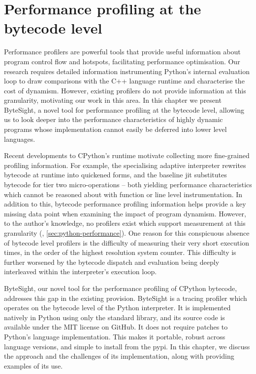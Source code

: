 \chapter{Performance profiling at the bytecode level} %
\label{chap:profiling-bytecode}

Performance profilers are powerful tools that provide useful information about program control flow and hotspots, facilitating performance optimisation.
Our research requires detailed information instrumenting Python's internal evaluation loop to draw comparisons with the C++ language runtime and characterise the cost of dynamism. However, existing profilers do not provide information at this granularity, motivating our work in this area. %
In this chapter we present ByteSight, a novel tool for performance profiling at the bytecode level, allowing us to look deeper into the performance characteristics of highly dynamic programs whose implementation cannot easily be deferred into lower level languages.


Recent developments to CPython's runtime motivate collecting more fine-grained profiling information.
For example, the specialising adaptive interpreter rewrites bytecode at runtime into quickened forms, and the baseline \ac{jit} substitutes bytecode for tier two micro-operations -- both yielding performance characteristics which cannot be reasoned about with function or line level instrumentation.
In addition to this, bytecode performance profiling information helps provide a key missing data point when examining the impact of program dynamism.
However, to the author's knowledge, no profilers exist which support measurement at this granularity (, \autoref{sec:python-performance}).
One reason for this conspicuous absence of bytecode level profilers is the difficulty of measuring their very short execution times, in the order of the highest resolution system counter. This difficulty is further worsened by the bytecode dispatch and evaluation being deeply interleaved within the interpreter's execution loop.

ByteSight, our novel tool for the performance profiling of CPython bytecode, addresses this gap in the existing provision.
ByteSight is a tracing profiler which operates on the bytecode level of the Python interpreter. It is implemented natively in Python using only the standard library, and its source code is available under the MIT license on GitHub. %
It does not require patches to Python's language implementation. This makes it portable, robust across language versions, and simple to install from the \ac{pypi}. %
In this chapter, we discuss the approach and the challenges of its implementation, along with providing examples of its use.


